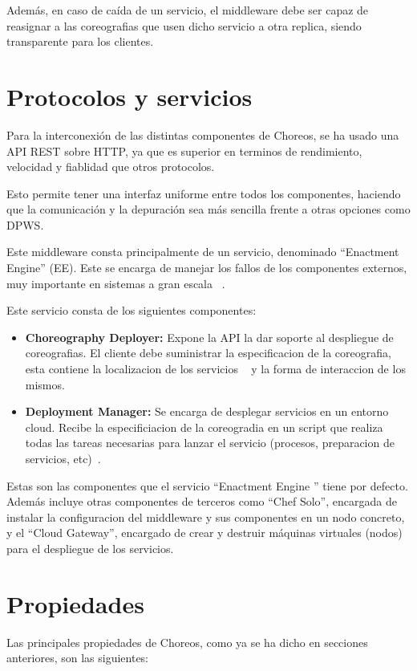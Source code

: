 \documentclass[runningheads]{llncs}
\begin{document}
Además, en caso de caída de un servicio, el middleware debe ser capaz de reasignar a las coreografias que usen dicho servicio a otra replica, siendo transparente para los clientes.
\section{Protocolos y servicios}
Para la interconexión de las distintas componentes de Choreos, se ha usado una API REST sobre HTTP, ya que es superior en terminos de rendimiento, velocidad y fiablidad que otros protocolos.~\cite{a_128}

Esto permite tener una interfaz uniforme entre todos los componentes, haciendo que la comunicación y la depuración sea más sencilla frente a otras opciones como DPWS. ~\cite{a_128}

Este middleware consta principalmente de un servicio, denominado ``Enactment Engine'' (EE). Este se encarga de manejar los fallos de los componentes externos, muy importante en sistemas a gran escala ~\cite{a_128}.

Este servicio consta de los siguientes componentes:

\begin{itemize}
    \item \textbf{Choreography Deployer: }Expone la API la dar soporte al despliegue de coreografias. El cliente debe suministrar la especificacion de la coreografia, esta contiene la localizacion de los servicios ~\cite{a_128} y la forma de interaccion de los mismos.
    \item \textbf{Deployment Manager: }Se encarga de desplegar servicios en un entorno cloud. Recibe la especificiacion de la coreogradia en un script que realiza todas las tareas necesarias para lanzar el servicio (procesos, preparacion de servicios, etc)~\cite{a_128}.
\end{itemize}

Estas son las componentes que el servicio ``Enactment Engine '' tiene por defecto. Además incluye otras componentes de terceros como ``Chef Solo'', encargada de instalar la configuracion del middleware y sus componentes en un nodo concreto, y el ``Cloud Gateway'', encargado de crear y destruir máquinas virtuales (nodos)~\cite{a_128} para el despliegue de los servicios.

\section{Propiedades}
Las principales propiedades de Choreos, como ya se ha dicho en secciones anteriores, son las siguientes:
\end{document}
